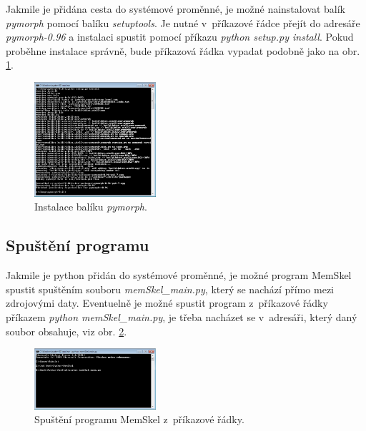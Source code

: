 Jakmile je přidána cesta do systémové proměnné, je možné nainstalovat balík \textit{pymorph} pomocí balíku \textit{setuptools}. Je nutné v~příkazové řádce přejít do adresáře \textit{pymorph-0.96} a instalaci spustit pomocí příkazu \textit{python setup.py install}. Pokud proběhne instalace správně, bude příkazová řádka vypadat podobně jako na obr. \ref{fig:cmd_pymorph}.

\begin{figure}[htb]
	\centering
	\includegraphics[width=0.4\textwidth]{cmd_pymorph.png}
	\caption{Instalace balíku \textit{pymorph}.}
	\label{fig:cmd_pymorph}
\end{figure}

\subsection{Spuštění programu}
Jakmile je python přidán do systémové proměnné, je možné program MemSkel spustit spuštěním souboru \textit{memSkel\_main.py}, který se nachází přímo mezi zdrojovými daty. Eventuelně je možné spustit program z~příkazové řádky příkazem \textit{python memSkel\_main.py}, je třeba nacházet se v~adresáři, který daný soubor obsahuje, viz obr. \ref{fig:run}.

\begin{figure}[htb]
	\centering
	\includegraphics[width=0.4\textwidth]{run.png}
	\caption{Spuštění programu MemSkel z~příkazové řádky.}
	\label{fig:run}
\end{figure}